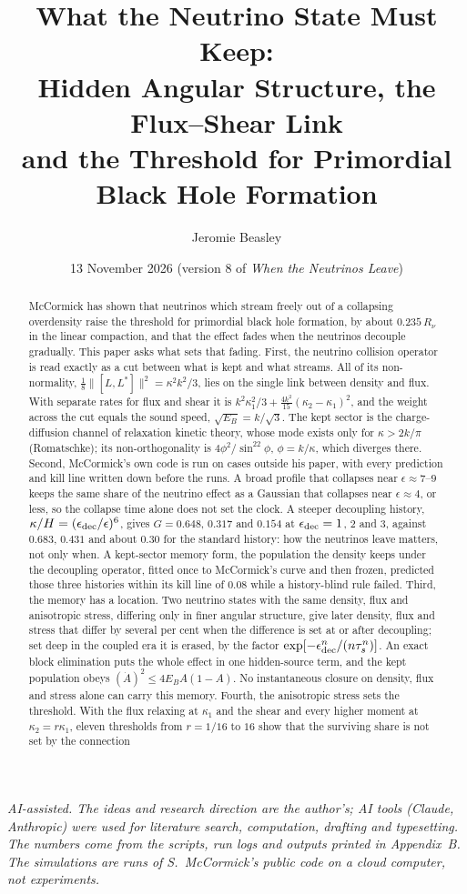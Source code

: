 \documentclass[11pt]{article}
\title{What the Neutrino State Must Keep:\\ Hidden Angular Structure, the Flux--Shear Link\\ and the Threshold for Primordial Black Hole Formation}
\author{Jeromie Beasley}
\date{13 November 2026 \quad (version 8 of \emph{When the Neutrinos Leave})}
\begin{document}
\maketitle

\noindent\emph{AI-assisted. The ideas and research direction are the author's; AI tools (Claude, Anthropic) were used for literature search, computation, drafting and typesetting. The numbers come from the scripts, run logs and outputs printed in Appendix~B. The simulations are runs of S.~McCormick's public code on a cloud computer, not experiments.}

\begin{abstract}
McCormick has shown that neutrinos which stream freely out of a collapsing overdensity raise the threshold for primordial black hole formation, by about $0.235\,R_\nu$ in the linear compaction, and that the effect fades when the neutrinos decouple gradually. This paper asks what sets that fading. First, the neutrino collision operator is read exactly as a cut between what is kept and what streams. All of its non-normality, $\tfrac18\lVert[L,L^\ast]\rVert^2=\kappa^2k^2/3$, lies on the single link between density and flux. With separate rates for flux and shear it is $k^2\kappa_1^2/3+\tfrac{4k^2}{15}(\kappa_2-\kappa_1)^2$, and the weight across the cut equals the sound speed, $\sqrt{E_B}=k/\sqrt3$. The kept sector is the charge-diffusion channel of relaxation kinetic theory, whose mode exists only for $\kappa>2k/\pi$ (Romatschke); its non-orthogonality is $4\phi^2/\sin^22\phi$, $\phi=k/\kappa$, which diverges there. Second, McCormick's own code is run on cases outside his paper, with every prediction and kill line written down before the runs. A broad profile that collapses near $\epsilon\approx7$--$9$ keeps the same share of the neutrino effect as a Gaussian that collapses near $\epsilon\approx4$, or less, so the collapse time alone does not set the clock. A steeper decoupling history, $\kappa/H=(\epsilon_{\rm dec}/\epsilon)^6$, gives $G=0.648$, $0.317$ and $0.154$ at $\epsilon_{\rm dec}=1$, $2$ and $3$, against $0.683$, $0.431$ and about $0.30$ for the standard history: how the neutrinos leave matters, not only when. A kept-sector memory form, the population the density keeps under the decoupling operator, fitted once to McCormick's curve and then frozen, predicted those three histories within its kill line of $0.08$ while a history-blind rule failed. Third, the memory has a location. Two neutrino states with the same density, flux and anisotropic stress, differing only in finer angular structure, give later density, flux and stress that differ by several per cent when the difference is set at or after decoupling; set deep in the coupled era it is erased, by the factor $\exp[-\epsilon_{\rm dec}^n/(n\tau_s^n)]$. An exact block elimination puts the whole effect in one hidden-source term, and the kept population obeys $(\dot A)^2\le4E_BA(1-A)$. No instantaneous closure on density, flux and stress alone can carry this memory. Fourth, the anisotropic stress sets the threshold. With the flux relaxing at $\kappa_1$ and the shear and every higher moment at $\kappa_2=r\kappa_1$, eleven thresholds from $r=1/16$ to $16$ show that the surviving share is not set by the connection 
\end{abstract}
\end{document}
